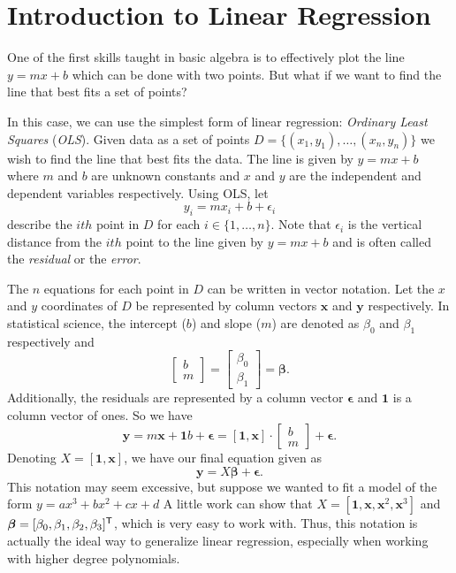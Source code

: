 \label{lab:LinearRegression}


\section*{Introduction to Linear Regression}
One of the first skills taught in basic algebra is to effectively plot the line $y=mx+b$ which can be done with two points. 
But what if we want to find the line that best fits a set of points?

In this case, we can use the simplest form of linear regression: \textit{Ordinary Least Squares} (\textit{OLS}). 
Given data as a set of points $D = \{ (x_1, y_1), \ldots, (x_n, y_n) \}$ we wish to find the line that best fits the data. 
The line is given by $y = mx+ b$ where $m$ and $b$ are unknown constants and $x$ and $y$ are the independent and dependent variables respectively. 
Using OLS, let \[ y_i = mx_i + b + \epsilon_i \] describe the $ith$ point in $D$ for each $i \in \{1, \ldots, n\}$.
Note that $\epsilon_i$ is the vertical distance from the $ith$ point to the line given by $y = mx + b$ and is often called the \textit{residual} or the \textit{error}.

The $n$ equations for each point in $D$ can be written in vector notation. 
Let the $x$ and $y$ coordinates of $D$ be represented by column vectors $\boldsymbol x$ and $\boldsymbol y$ respectively.
In statistical science, the intercept ($b$) and slope ($m$) are denoted as $\beta_0$ and $\beta_1$ respectively and 
\[ \begin{bmatrix} b \\ m \end{bmatrix} = \begin{bmatrix} \beta_0 \\ \beta_1 \end{bmatrix} = \boldsymbol\beta .\]
Additionally, the residuals are represented by a column vector  $\boldsymbol\epsilon$ and $\boldsymbol 1$ is a column vector of ones. 
So we have \[ \boldsymbol y = m \boldsymbol x + \boldsymbol 1 b + \boldsymbol\epsilon = [\boldsymbol 1, \boldsymbol x] \cdot \begin{bmatrix} b \\ m \end{bmatrix} + \boldsymbol\epsilon. \]
Denoting $X = [ \boldsymbol 1, \boldsymbol x ]$, we have our final equation given as \[ \boldsymbol y = X \boldsymbol\beta + \boldsymbol\epsilon . \]
This notation may seem excessive, but suppose we wanted to fit a model of the form $y=ax^3 + bx^2 + cx+d$
A little work can show that $X=[ \boldsymbol 1,\boldsymbol x, \boldsymbol x^2, \boldsymbol x^3]$ and $\boldsymbol\beta = [\beta_0, \beta_1, \beta_2, \beta_3]^{\mathsf T} $, which is very easy to work with.
Thus, this notation is actually the ideal way to generalize linear regression, especially when working with higher degree polynomials.

